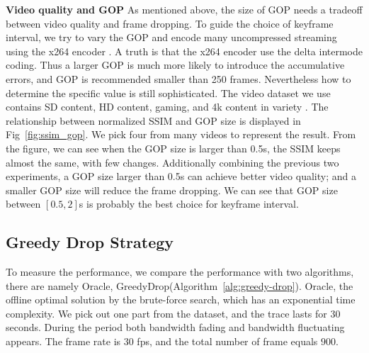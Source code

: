 \textbf{Video quality and GOP} As mentioned above, the size of GOP needs a tradeoff between video quality and frame dropping. To guide the choice of keyframe interval, we try to vary the GOP and encode many uncompressed streaming using the x264 encoder \cite{x264}. A truth is that the x264 encoder use the delta intermode coding. Thus a larger GOP is much more likely to introduce the accumulative errors, and GOP is recommended smaller than 250 frames. Nevertheless how to determine the specific value is still sophisticated. The video dataset we use contains SD content, HD content, gaming, and 4k content in variety \cite{video_dataset}. The relationship between normalized SSIM and GOP size is displayed in Fig~\ref{fig:ssim_gop}.
We pick four from many videos to represent the result. From the figure, we can see when the GOP size is larger than 0.5s, the SSIM keeps almost the same, with few changes. Additionally combining the previous two experiments, a GOP size larger than 0.5s can achieve better video quality; and a smaller GOP size will reduce the frame dropping. We can see that GOP size between $[0.5,2]$s is probably the best choice for keyframe interval.

\iffalse

\textbf{Varying bitrate.}
To make the conclusion more visible, we fix keyframe interval to be 8s and introduce network interruption between 19s and 21s. In different experiments, we provide sufficient network bandwidth and vary the bitrate to be 1000kbps, 1500kbps, 2000kbps, and 2500kbps. The frame drop is shown in Table~\ref{tab:bitrate}. The different bitrates do not make much difference, the number of drop in all cases is about 149.

\textbf{Summary.} We summarize and get conclusions. First, reducing keyframe interval leads to less frame drop. Second, bitrate does not influence frame drop for the short-term case, but the quality of each picture. Preliminary Evaluation points out that a small GOP is one useful try.
\fi

\vspace{-0.05in}
\subsection{Greedy Drop Strategy}
To measure the performance, we compare the performance with two algorithms, there are namely Oracle, GreedyDrop(Algorithm~\ref{alg:greedy-drop}). Oracle, the offline optimal solution by the brute-force search, which has an exponential time complexity. We pick out one part from the dataset, and the trace lasts for $30$ seconds. During the period both bandwidth fading and bandwidth fluctuating appears. The frame rate is $30$ fps, and the total number of frame equals $900$.

